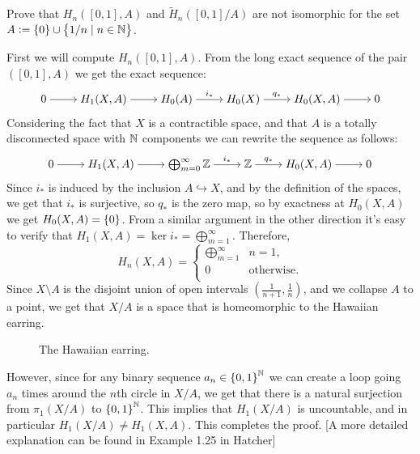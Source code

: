 \documentclass[11pt,a4paper]{article}
\begin{document}
\begin{exercise}
  Prove that $H_n([0,1],A)$ and $\widetilde H_n([0,1]/A)$
  are not isomorphic for the set $A := \left\{0\right\} \cup \left\{1/n \mid n \in \mathbb{N}\right\}$.
\end{exercise}
\begin{solution}
  First we will compute $H_n([0,1],A)$.
  From the long exact sequence of the pair $([0,1],A)$
  we get the exact sequence:
  \[\begin{tikzcd}[ampersand replacement=\&,cramped]
    0 \& {H_1(X,A)} \& {H_0(A)} \& {H_0(X)} \& {H_0(X,A)} \& 0
    \arrow[from=1-1, to=1-2]
    \arrow[from=1-2, to=1-3]
    \arrow["{i_*}", from=1-3, to=1-4]
    \arrow["{q_*}",from=1-4, to=1-5]
    \arrow[from=1-5, to=1-6]
  \end{tikzcd}\]
  Considering the fact that $X$ is a contractible space,
  and that $A$ is a totally disconnected space with $\mathbb{N}$
  components we can rewrite the sequence as follows:
  \[\begin{tikzcd}[ampersand replacement=\&,cramped]
    0 \& {H_1(X,A)} \& \bigoplus_{m=0}^{\infty} \Z \& \Z \& {H_0(X,A)} \& 0
    \arrow[from=1-1, to=1-2]
    \arrow[from=1-2, to=1-3]
    \arrow["{i_*}", from=1-3, to=1-4]
    \arrow["{q_*}",from=1-4, to=1-5]
    \arrow[from=1-5, to=1-6]
  \end{tikzcd}\]
  Since $i_*$ is induced by the inclusion $A \hookrightarrow X$,
  and by the definition of the spaces,
  we get that $i_*$ is surjective,
  so $q_*$ is the zero map,
  so by exactness at $H_0(X,A)$ we get $H_0(X,A) = \left\{0\right\}$.
  From a similar argument in the other direction it's easy to verify
  that $H_1(X,A) = \ker i_* = \bigoplus_{m=1}^{\infty}$.
  Therefore,
  \[
    H_n(X,A) =
    \begin{cases}
      \bigoplus_{m=1}^{\infty} &n = 1, \\
      0 &\text{otherwise}. \\
    \end{cases}
  \]
  Since $X \setminus A$ is the disjoint union of open intervals
  $(\frac{1}{n+1},\frac{1}{n})$, and we collapse $A$ to a point,
  we get that $X/A$ is a space that is homeomorphic to the Hawaiian earring. 
  \begin{figure}[H]
    \centering
    \caption{The Hawaiian earring.}
  \end{figure}
  However, since for any binary sequence $a_n \in \left\{0,1\right\}^{\mathbb{N}}$
  we can create a loop going $a_n$ times around the $n$th circle
  in $X/A$, we get that
  there is a natural surjection from $\pi_1(X/A)$ to $\left\{0,1\right\}^{\mathbb{N}}$.
  This implies that $H_1(X/A)$ is uncountable,
  and in particular $H_1(X/A) \neq H_1(X,A)$.
  This completes the proof.
  [A more detailed explanation can be found in Example 1.25 in Hatcher] 
\end{solution}
\end{document}
